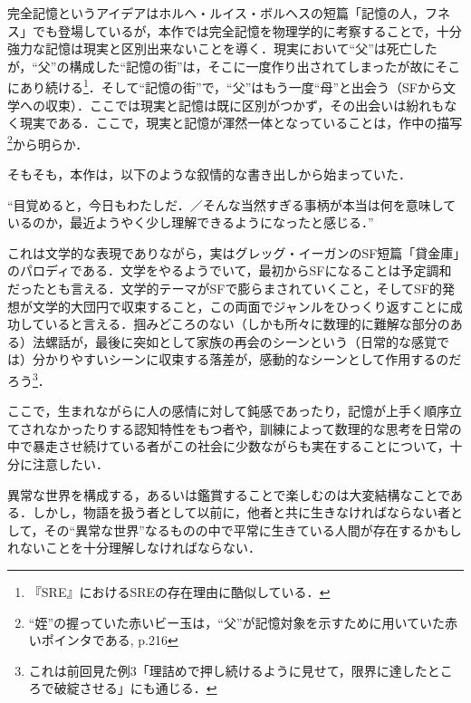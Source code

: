 \documentclass[10pt, a5paper, twoside]{jsarticle}
\theoremstyle{definition}
\begin{document}
		完全記憶というアイデアはホルヘ・ルイス・ボルヘスの短篇「記憶の人，フネス」でも登場しているが，本作では完全記憶を物理学的に考察することで，十分強力な記憶は現実と区別出来ないことを導く．現実において“父”は死亡したが，“父”の構成した“記憶の街”は，そこに一度作り出されてしまったが故にそこにあり続ける\footnote{『SRE』におけるSREの存在理由に酷似している．}．そして“記憶の街”で，“父”はもう一度“母”と出会う（SFから文学への収束）．ここでは現実と記憶は既に区別がつかず，その出会いは紛れもなく現実である．ここで，現実と記憶が渾然一体となっていることは，作中の描写\footnote{“姪”の握っていた赤いビー玉は，“父”が記憶対象を示すために用いていた赤いポインタである, \cite{hgn} p.216}から明らか．

		そもそも，本作は，以下のような叙情的な書き出しから始まっていた．

		“目覚めると，今日もわたしだ．／そんな当然すぎる事柄が本当は何を意味しているのか，最近ようやく少し理解できるようになったと感じる．”

		これは文学的な表現でありながら，実はグレッグ・イーガンのSF短篇「貸金庫」のパロディである．文学をやるようでいて，最初からSFになることは予定調和だったとも言える．文学的テーマがSFで膨らまされていくこと，そしてSF的発想が文学的大団円で収束すること，この両面でジャンルをひっくり返すことに成功していると言える．掴みどころのない（しかも所々に数理的に難解な部分のある）法螺話が，最後に突如として家族の再会のシーンという（日常的な感覚では）分かりやすいシーンに収束する落差が，感動的なシーンとして作用するのだろう\footnote{これは前回見た例3「理詰めで押し続けるように見せて，限界に達したところで破綻させる」にも通じる．}．

		ここで，生まれながらに人の感情に対して鈍感であったり，記憶が上手く順序立てされなかったりする認知特性をもつ者\cite{smz}や，訓練によって数理的な思考を日常の中で暴走させ続けている者\cite{kmr}がこの社会に少数ながらも実在することについて，十分に注意したい．

		異常な世界を構成する，あるいは鑑賞することで楽しむのは大変結構なことである．しかし，物語を扱う者として以前に，他者と共に生きなければならない者として，その“異常な世界”なるものの中で平常に生きている人間が存在するかもしれないことを十分理解しなければならない\cite{nkm}．
\end{document}

